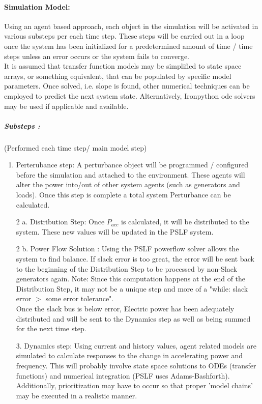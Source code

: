 \documentclass[12pt]{article}
\begin{document}
\paragraph{Simulation Model:}
Using an agent based approach, each object in the simulation will be activated in various substeps per each time step. These steps will be carried out in a loop once the system has been initialized for a predetermined amount of time / time steps unless an error occurs or the system fails to converge.\vspace{1em}\\ 
It is assumed that transfer function models may be simplified to state space arrays, or something equivalent, that can be populated by specific model parameters. Once solved, i.e. slope is found, other numerical techniques can be employed to predict the next system state. Alternatively, Ironpython ode solvers may be used if applicable and available.
\subparagraph{Substeps :}(Performed each time step/ main model step)
\begin{enumerate}
	\item Perterubance step: A perturbance object will be programmed / configured before the simulation and attached to the environment. These agents will alter the power into/out of other system agents (such as generators and loads). Once this step is complete a total system Perturbance can be calculated.
	\item[2 a.] Distribution Step: Once $P_{acc}$ is calculated, it will be distributed to the system. These new values will be updated in the PSLF system.
	\item[2 b.] Power Flow Solution : Using the PSLF powerflow solver allows the system to find balance. If slack error is too great, the error will be sent back to the beginning of the Distribution Step to be processed  by non-Slack generators again. Note: Since this computation happens at the end of the Distribution Step, it may not be a unique step and more of a "while: slack error $>$ some error tolerance".\\
	Once the slack bus is below error, Electric power has been adequately distributed and will be sent to the Dynamics step as well as being summed for the next time step.
	\item[3.] Dynamics step: Using current and history values, agent related models are simulated to calculate responses to the change in accelerating power and frequency. This will probably involve state space solutions to ODEs (transfer functions) and numerical integration (PSLF uses Adams-Bashforth). Additionally, prioritization may have to occur so that proper 'model chains' may be executed in a realistic manner.
\end{enumerate}
\end{document}

